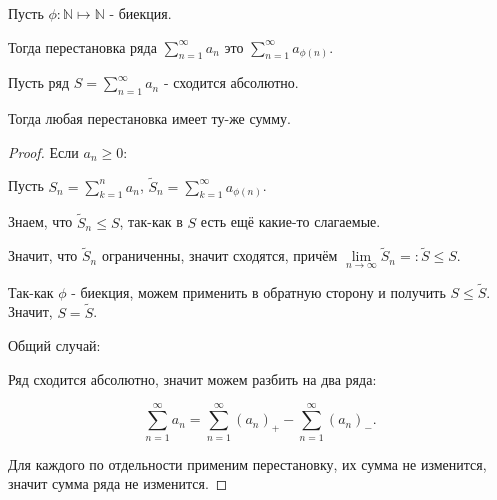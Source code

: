 \begin{definition} \thmslashn 

    Пусть $\phi : \mathbb{N} \mapsto \mathbb{N}$ - биекция.

    Тогда перестановка ряда $\sum\limits_{n=1}^{\infty} a_{n}$ это $\sum\limits_{n=1}^{\infty} a_{\phi(n)}$.
\end{definition}
\begin{theorem} \thmslashn

    Пусть ряд $S = \sum\limits_{n=1}^{\infty} a_{n}$ - сходится абсолютно.

    Тогда любая перестановка имеет ту-же сумму.

    \begin{proof} \thmslashn
    
        Если $a_{n} \ge 0$: 

        Пусть $S_{n} = \sum\limits_{k=1}^{n} a_{n}$, $\tilde{S}_{n} = \sum\limits_{k=1}^{\infty} a_{\phi(n)}$.

        Знаем, что $\tilde{S}_{n} \le S$, так-как в $S$ есть ещё какие-то слагаемые.

        Значит, что $\tilde{S}_{n}$ ограниченны, значит сходятся, причём $\lim\limits_{n \to \infty} \tilde{S}_{n} =: \tilde{S} \le S$.

        Так-как $\phi$ - биекция, можем применить в обратную сторону и получить $S \le \tilde{S}$. Значит, $S = \tilde{S}$.

        Общий случай:

        Ряд сходится абсолютно, значит можем разбить на два ряда:

        \[ \sum\limits_{n=1}^{\infty} a_{n} = \sum\limits_{n=1}^{\infty} (a_{n})_{+} - \sum\limits_{n=1}^{\infty} (a_{n})_{-} .\]

        Для каждого по отдельности применим перестановку, их сумма не изменится, значит сумма ряда не изменится.
    \end{proof}
\end{theorem}

